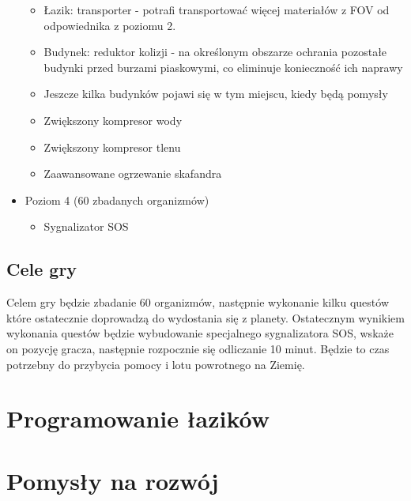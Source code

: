 \documentclass[a4paper,12pt]{article}
\begin{document}
\begin{itemize}
\begin{itemize}
		\item Łazik: transporter - potrafi transportować więcej materiałów z FOV od odpowiednika z poziomu 2.
		\item Budynek: reduktor kolizji - na określonym obszarze ochrania pozostałe budynki przed burzami piaskowymi, co eliminuje konieczność ich naprawy
		\item Jeszcze kilka budynków pojawi się w tym miejscu, kiedy będą pomysły
		\item Zwiększony kompresor wody
		\item Zwiększony kompresor tlenu
		\item Zaawansowane ogrzewanie skafandra
	\end{itemize}
	\item Poziom 4 (60 zbadanych organizmów)
	\begin{itemize}
		\item Sygnalizator SOS
	\end{itemize}
\end{itemize}
\subsection{Cele gry}
Celem gry będzie zbadanie 60 organizmów, następnie wykonanie kilku questów które ostatecznie doprowadzą do wydostania się z planety. Ostatecznym wynikiem wykonania questów będzie wybudowanie specjalnego sygnalizatora SOS, wskaże on pozycję gracza, następnie rozpocznie się odliczanie 10 minut. Będzie to czas potrzebny do przybycia pomocy i lotu powrotnego na Ziemię.
\section{Programowanie łazików}
\label{section:programming}
\section{Pomysły na rozwój}
\end{document}

